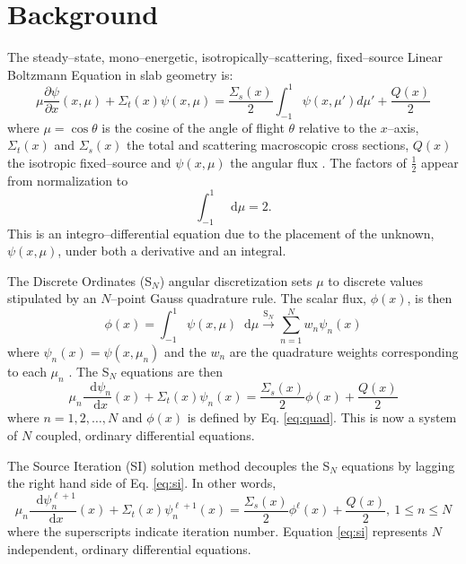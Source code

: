 \documentclass{anstrans}
\newcommand{\SN}{S$_N$\xspace}
\newcommand{\ud}{\mathop{}\!\mathrm{d}} %
\newcommand{\pderiv}[2]{\frac{\partial #1}{\partial #2}}
\newcommand{\dderiv}[2]{\frac{\ud #1}{\ud #2}}
\begin{document}
\section{Background}
	The steady--state, mono--energetic, isotropically--scattering, fixed--source Linear Boltzmann Equation in slab geometry is: 
		\begin{equation} \label{eq:bte}
			\mu \pderiv{\psi}{x}(x, \mu) + \Sigma_t(x) \psi(x,\mu) = 
			\frac{\Sigma_s(x)}{2} \int_{-1}^{1} \psi(x, \mu') d\mu' + \frac{Q(x)}{2}
		\end{equation}
	where $\mu = \cos\theta$ is the cosine of the angle of flight $\theta$ relative to the $x$--axis, $\Sigma_t(x)$ and $\Sigma_s(x)$ the total and scattering macroscopic cross sections, $Q(x)$ the isotropic fixed--source and $\psi(x, \mu)$ the angular flux \cite{adams}. The factors of $\frac{1}{2}$ appear from normalization to 
		\begin{equation}
			\int_{-1}^1 \ud \mu = 2. 
		\end{equation}
	This is an integro--differential equation due to the placement of the unknown, $\psi(x,\mu)$, under both a derivative and an integral.

	The Discrete Ordinates (\SN) angular discretization sets $\mu$ to discrete values stipulated by an $N$--point Gauss quadrature rule. The scalar flux, $\phi(x)$, is then 
		\begin{equation} \label{eq:quad}
			\phi(x) = \int_{-1}^1 \psi(x, \mu) \ud\mu 
				\xrightarrow{\text{S}_N} \sum_{n=1}^N w_n \psi_n(x)
		\end{equation}
	where $\psi_n(x) = \psi(x,\mu_n)$ and the $w_n$ are the quadrature weights corresponding to each $\mu_n$ \cite{llnl}. The \SN equations are then 
		\begin{equation} \label{eq:sn}
			\mu_n \dderiv{\psi_n}{x}(x) + \Sigma_t(x) \psi_n(x) = 
			\frac{\Sigma_s(x)}{2} \phi(x) + \frac{Q(x)}{2} 
		\end{equation}
	where $n = 1, 2, \dots, N$ and $\phi(x)$ is defined by Eq. \ref{eq:quad}. This is now a system of $N$ coupled, ordinary differential equations. 

	The Source Iteration (SI) solution method decouples the \SN equations by lagging the right hand side of Eq. \ref{eq:si}. In other words, 
		\begin{equation} \label{eq:si}
			\mu_n \dderiv{\psi_n^{\ell+1}}{x}(x) + \Sigma_t(x) \psi_n^{\ell+1}(x) = 
			\frac{\Sigma_s(x)}{2} \phi^{\ell}(x) + \frac{Q(x)}{2}, \ 1 \leq n \leq N
		\end{equation}
	where the superscripts indicate iteration number. 
	Equation \ref{eq:si} represents $N$ independent, ordinary differential equations. 
\end{document}
